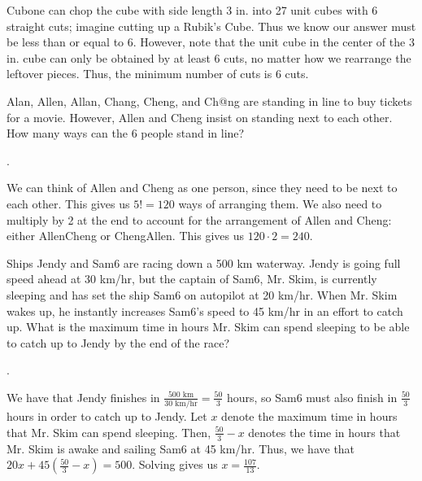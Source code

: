 \documentclass[11pt]{article}
\begin{document}
\begin{solution}
Cubone can chop the cube with side length 3 in. into 27 unit cubes with 6 straight cuts; imagine cutting up a Rubik's Cube. Thus we know our answer must be less than or equal to 6. However, note that the unit cube in the center of the 3 in. cube can only be obtained by at least 6 cuts, no matter how we rearrange the leftover pieces. Thus, the minimum number of cuts is 6 cuts.
\end{solution}

\begin{problem}
Alan, Allen, Allan, Chang, Cheng, and Ch@ng are standing in line to buy tickets for a movie. However, Allen and Cheng insist on standing next to each other. How many ways can the 6 people stand in line?
\end{problem}

\begin{answer}
.
\end{answer}

\begin{solution}
We can think of Allen and Cheng as one person, since they need to be next to each other. This gives us $5! = 120$ ways of arranging them. We also need to multiply by 2 at the end to account for the arrangement of Allen and Cheng: either AllenCheng or ChengAllen. This gives us $120\cdot2 = \boxed{240}$.
\end{solution}

\begin{problem}
Ships Jendy and Sam6 are racing down a 500 km waterway. Jendy is going full speed ahead at 30 km/hr, but the captain of Sam6, Mr. Skim, is currently sleeping and has set the ship Sam6 on autopilot at 20 km/hr. When Mr. Skim wakes up, he instantly increases Sam6's speed to 45 km/hr in an effort to catch up. What is the maximum time in hours Mr. Skim can spend sleeping to be able to catch up to Jendy by the end of the race?
\end{problem}

\begin{answer}
.
\end{answer}

\begin{solution}
We have that Jendy finishes in $\frac{500 \text{ km}}{30 \text{ km/hr}} = \frac{50}{3}$ hours, so Sam6 must also finish in $\frac{50}{3}$ hours in order to catch up to Jendy. Let $x$ denote the maximum time in hours that Mr. Skim can spend sleeping. Then, $\frac{50}{3} - x$ denotes the time in hours that Mr. Skim is awake and sailing Sam6 at 45 km/hr. Thus, we have that $20x + 45(\frac{50}{3}-x) = 500$. Solving gives us $x = \boxed{\frac{107}{13}}$.
\end{solution}
\end{document}
